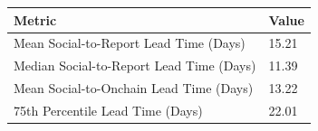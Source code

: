 \begin{tabular}{ll}
\toprule
Metric & Value \\
\midrule
Mean Social-to-Report Lead Time (Days) & 15.21 \\
Median Social-to-Report Lead Time (Days) & 11.39 \\
Mean Social-to-Onchain Lead Time (Days) & 13.22 \\
75th Percentile Lead Time (Days) & 22.01 \\
\bottomrule
\end{tabular}

